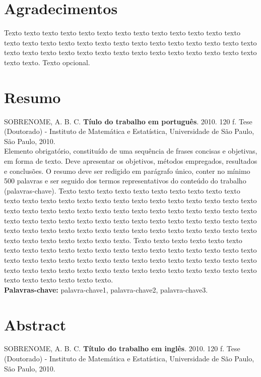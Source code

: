 \documentclass[12pt,twoside,a4paper]{book} %
\begin{document}
\chapter*{Agradecimentos}
Texto texto texto texto texto texto texto texto texto texto texto texto texto
texto texto texto texto texto texto texto texto texto texto texto texto texto
texto texto texto texto texto texto texto texto texto texto texto texto texto
texto texto texto texto. Texto opcional.


\chapter*{Resumo}

\noindent SOBRENOME, A. B. C. \textbf{Tíulo do trabalho em português}. 
2010. 120 f.
Tese (Doutorado) - Instituto de Matemática e Estatística,
Universidade de São Paulo, São Paulo, 2010.
\\

Elemento obrigatório, constituído de uma sequência de frases concisas e
objetivas, em forma de texto.  Deve apresentar os objetivos, métodos empregados,
resultados e conclusões.  O resumo deve ser redigido em parágrafo único, conter
no mínimo 500 palavras e ser seguido dos termos representativos do conteúdo do
trabalho (palavras-chave). 
Texto texto texto texto texto texto texto texto texto texto texto texto texto
texto texto texto texto texto texto texto texto texto texto texto texto texto
texto texto texto texto texto texto texto texto texto texto texto texto texto
texto texto texto texto texto texto texto texto texto texto texto texto texto
texto texto texto texto texto texto texto texto texto texto texto texto texto
texto texto texto texto texto texto texto texto.
Texto texto texto texto texto texto texto texto texto texto texto texto texto
texto texto texto texto texto texto texto texto texto texto texto texto texto
texto texto texto texto texto texto texto texto texto texto texto texto texto
texto texto texto texto texto texto texto texto texto texto texto texto texto
texto texto.
\\

\noindent \textbf{Palavras-chave:} palavra-chave1, palavra-chave2, palavra-chave3.

\chapter*{Abstract}
\noindent SOBRENOME, A. B. C. \textbf{Título do trabalho em inglês}. 
2010. 120 f.
Tese (Doutorado) - Instituto de Matemática e Estatística,
Universidade de São Paulo, São Paulo, 2010.
\\
\end{document}
